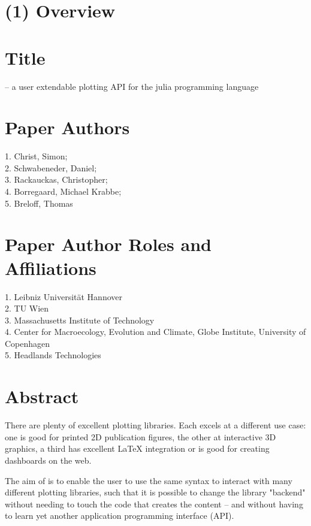 \documentclass[a4paper]{article}
\begin{document}
\section*{(1) Overview}

\vspace{0.5cm}

\section*{Title}

\Plots -- a user extendable plotting API for the julia programming language

\section*{Paper Authors}

1. Christ, Simon; \\
2. Schwabeneder, Daniel; \\
3. Rackauckas, Christopher; \\
4. Borregaard, Michael Krabbe; \\
5. Breloff, Thomas

\section*{Paper Author Roles and Affiliations}
1. Leibniz Universit\"at Hannover\\
2. TU Wien \\
3. Massachusetts Institute of Technology \\
4. Center for Macroecology, Evolution and Climate, Globe Institute, University of Copenhagen \\
5. Headlands Technologies

\section*{Abstract}


There are plenty of excellent plotting libraries.
Each excels at a different use case: one is good for printed 2D publication figures, the other at interactive 3D graphics, a third has excellent \LaTeX{} integration or is good for creating dashboards on the web.

The aim of \Plots is to enable the user to use the same syntax to interact with many different plotting libraries, such that it is possible to change the library "backend" without needing to touch the code that creates the content – and without having to learn yet another application programming interface (API).
\end{document}
